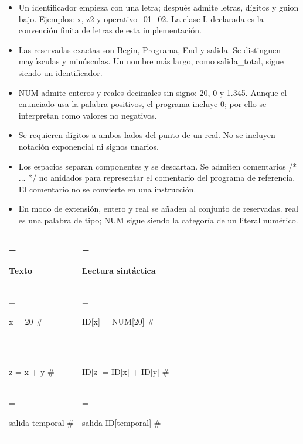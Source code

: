 \documentclass[10pt,a4paper]{article}
\newcommand{\ReportHeading}[1]{\par\addvspace{6pt}{\color{Accent}\bfseries\fontsize{10.8}{14}\selectfont #1\par}\nobreak\vspace{2pt}}
\begin{document}
\begin{itemize}[leftmargin=13pt,itemsep=3pt,topsep=3pt,parsep=0pt]

\item Un identificador empieza con una letra; después admite letras, dígitos y guion bajo. Ejemplos: x, z2 y operativo\_\allowbreak{}01\_\allowbreak{}02. La clase L declarada es la convención finita de letras de esta implementación.

\item Las reservadas exactas son Begin, Programa, End y salida. Se distinguen mayúsculas y minúsculas. Un nombre más largo, como salida\_\allowbreak{}total, sigue siendo un identificador.

\item NUM admite enteros y reales decimales sin signo: 20, 0 y 1.345. Aunque el enunciado usa la palabra positivos, el programa incluye 0; por ello se interpretan como valores no negativos.

\item Se requieren dígitos a ambos lados del punto de un real. No se incluyen notación exponencial ni signos unarios.

\item Los espacios separan componentes y se descartan. Se admiten comentarios /\allowbreak{}* ... */\allowbreak{} no anidados para representar el comentario del programa de referencia. El comentario no se convierte en una instrucción.

\item En modo de extensión, entero y real se añaden al conjunto de reservadas. real es una palabra de tipo; NUM sigue siendo la categoría de un literal numérico.

\end{itemize}

\ReportHeading{Una categoría, muchos lexemas}

\begingroup\fontsize{8.0}{10.8}\selectfont
\setlength{\tabcolsep}{4pt}\renewcommand{\arraystretch}{1.16}
\noindent\begin{tabularx}{\linewidth}{|>{\hsize=0.800000\hsize\linewidth=\hsize\raggedright\arraybackslash}X|>{\hsize=1.200000\hsize\linewidth=\hsize\raggedright\arraybackslash}X|}\hline
\rowcolor{TableHead} \textbf{Texto} & \textbf{Lectura sintáctica} \\\hline
x = 20 \# & ID[x] = NUM[20] \# \\\hline
z = x + y \# & ID[z] = ID[x] + ID[y] \# \\\hline
salida temporal \# & salida ID[temporal] \# \\\hline
\end{tabularx}\par\endgroup\vspace{5pt}
\end{document}
